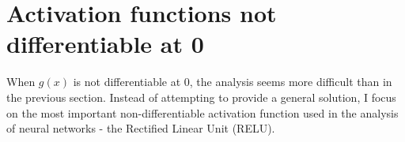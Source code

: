 \documentclass[a4paper]{article}
\newcommand{\eref}[1]{(\ref {eq:#1})}
\newcommand{\be}{\begin{equation}}
\newcommand{\ee}{\end{equation}}
\begin{document}






\section{Activation functions not differentiable at 0}
When $g(x)$ is not differentiable at 0, the analysis seems more difficult than in the previous section. Instead of attempting to provide a general solution, I focus on the most important non-differentiable activation function used in the analysis of neural networks - the Rectified Linear Unit (RELU).
\end{document}
